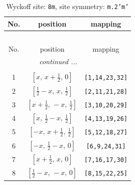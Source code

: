 \documentclass[fleqn,8pt]{jsarticle}
\begin{document}
\begin{longtable}{ccc}
\caption{Wyckoff site: {\tt 8m}, site symmetry: {\tt m.2'm'}}
 \\
 \hline \hline
No. & position & mapping \\ \hline \endfirsthead

\multicolumn{2}{l}{\tablename\ \thetable{}} \\
 \hline \hline
No. & position & mapping \\ \hline \endhead

 \hline \hline
\multicolumn{2}{r}{\footnotesize\it continued ...} \\ \endfoot

 \hline \hline
\multicolumn{2}{r}{} \\ \endlastfoot

1 & $\left[ x,\, x + \frac{1}{2},\, 0 \right]$ & {\tt [1,14,23,32]} \\ \hline
2 & $\left[ \frac{1}{2} - x,\, x,\, \frac{1}{2} \right]$ & {\tt [2,11,21,28]} \\ \hline
3 & $\left[ x + \frac{1}{2},\, - x,\, \frac{1}{2} \right]$ & {\tt [3,10,20,29]} \\ \hline
4 & $\left[ x,\, \frac{1}{2} - x,\, \frac{1}{2} \right]$ & {\tt [4,13,19,26]} \\ \hline
5 & $\left[ - x,\, x + \frac{1}{2},\, \frac{1}{2} \right]$ & {\tt [5,12,18,27]} \\ \hline
6 & $\left[ - x,\, \frac{1}{2} - x,\, 0 \right]$ & {\tt [6,9,24,31]} \\ \hline
7 & $\left[ x + \frac{1}{2},\, x,\, 0 \right]$ & {\tt [7,16,17,30]} \\ \hline
8 & $\left[ \frac{1}{2} - x,\, - x,\, 0 \right]$ & {\tt [8,15,22,25]} \\
\end{longtable}
\renewcommand{\arraystretch}{1.2}
\end{document}
